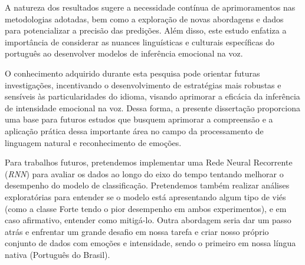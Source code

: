 A natureza dos resultados sugere a necessidade contínua de aprimoramentos nas metodologias adotadas, bem como a exploração de novas abordagens e dados para potencializar a precisão das predições. Além disso, este estudo enfatiza a importância de considerar as nuances linguísticas e culturais específicas do português ao desenvolver modelos de inferência emocional na voz.

O conhecimento adquirido durante esta pesquisa pode orientar futuras investigações, incentivando o desenvolvimento de estratégias mais robustas e sensíveis às particularidades do idioma, visando aprimorar a eficácia da inferência de intensidade emocional na voz. Dessa forma, a presente dissertação proporciona uma base para futuros estudos que busquem aprimorar a compreensão e a aplicação prática dessa importante área no campo da processamento de linguagem natural e reconhecimento de emoções.

Para trabalhos futuros, pretendemos implementar uma Rede Neural Recorrente (\textit{RNN}) para avaliar os dados ao longo do eixo do tempo tentando melhorar o desempenho do modelo de classificação. Pretendemos também realizar análises exploratórias para entender se o modelo está apresentando algum tipo de viés (como a classe Forte tendo o pior desempenho em ambos experimentos), e em caso afirmativo, entender como mitigá-lo. Outra abordagem seria dar um passo atrás e enfrentar um grande desafio em nossa tarefa e criar nosso próprio conjunto de dados com emoções e intensidade, sendo o primeiro em nossa língua nativa (Português do Brasil).
